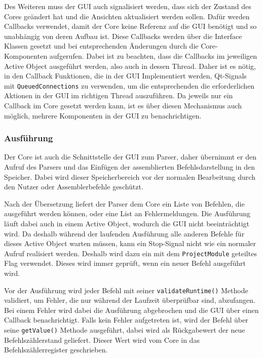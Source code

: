 Des Weiteren muss der GUI auch signalisiert werden, dass sich der Zustand des
Cores geändert hat und die Ansichten aktualisiert werden sollen. Dafür werden
Callbacks verwendet, damit der Core keine Referenz auf die GUI benötigt und so
unabhängig von deren Aufbau ist. Diese Callbacks werden über die Interface
Klassen gesetzt und bei entsprechenden Änderungen durch die Core-Komponenten
aufgerufen. Dabei ist zu beachten, dass die Callbacks im jeweiligen Active
Object ausgeführt werden, also auch in dessen Thread. Daher ist es nötig, in den
Callback Funktionen, die in der GUI Implementiert werden, Qt-Signals mit
\texttt{QueuedConnections} zu verwenden, um die entsprechenden die
erforderlichen Aktionen in der GUI im richtigen Thread auszuführen. Da jeweils
nur ein Callback im Core gesetzt werden kann, ist es über diesen Mechanismus
auch möglich, mehrere Komponenten in der GUI zu benachrichtigen.

\subsubsection{Ausführung}

Der Core ist auch die Schnittstelle der GUI zum Parser, daher übernimmt er den
Aufruf des Parsers und das Einfügen der assemblierten Befehlsdarstellung in den
Speicher. Dabei wird dieser Speicherbereich vor der normalen Bearbeitung durch
den Nutzer oder Assemblerbefehle geschützt.

Nach der Übersetzung liefert der Parser dem Core ein Liste von Befehlen, die
ausgeführt werden können, oder eine List an Fehlermeldungen. Die Ausführung
läuft dabei auch in einem Active Object, wodurch die GUI nicht beeinträchtigt
wird. Da deshalb während der laufenden Ausführung alle anderen Befehle für
dieses Active Object warten müssen, kann ein Stop-Signal nicht wie ein normaler
Aufruf realisiert werden. Deshalb wird dazu ein mit dem \texttt{ProjectModule}
geteiltes Flag verwendet. Dieses wird immer geprüft, wenn ein neuer Befehl
ausgeführt wird.

Vor der Ausführung wird jeder Befehl mit seiner \texttt{validateRuntime()}
Methode validiert, um Fehler, die nur während der Laufzeit überprüfbar sind,
abzufangen. Bei einem Fehler wird dabei die Ausführung abgebrochen und die GUI
über einen Callback benachrichtigt. Falls kein Fehler aufgetreten ist, wird der
Befehl über seine \texttt{getValue()} Methode ausgeführt, dabei wird als
Rückgabewert der neue Befehlszählerstand geliefert. Dieser Wert wird vom Core in
das Befehlszählerregister geschrieben.

